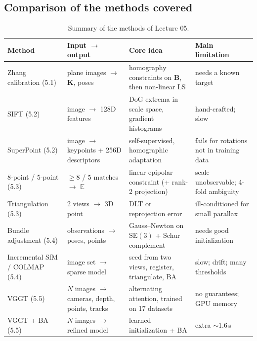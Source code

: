 \documentclass[11pt,a4paper]{article}
\newcommand{\E}{\mathbb{E}}
\newcommand{\SE}{\mathrm{SE}(3)}
\theoremstyle{definition}
\theoremstyle{plain}
\theoremstyle{remark}
\begin{document}
\subsection*{Comparison of the methods covered}
\begin{table}[H]
\centering
\small
\begin{tabular}{@{}p{2.9cm}p{3.5cm}p{4.0cm}p{3.1cm}@{}}
\toprule
Method & Input $\to$ output & Core idea & Main limitation\\
\midrule
Zhang calibration (5.1) & plane images $\to$ $\bm K$, poses & homography constraints on $\bm B$, then non-linear LS & needs a known target\\
SIFT (5.2) & image $\to$ 128D features & DoG extrema in scale space, gradient histograms & hand-crafted; slow\\
SuperPoint (5.2) & image $\to$ keypoints + 256D descriptors & self-supervised, homographic adaptation & fails for rotations not in training data\\
8-point / 5-point (5.3) & $\ge8$ / $5$ matches $\to$ $\E$ & linear epipolar constraint (+ rank-2 projection) & scale unobservable; 4-fold ambiguity\\
Triangulation (5.3) & 2 views $\to$ 3D point & DLT or reprojection error & ill-conditioned for small parallax\\
Bundle adjustment (5.4) & observations $\to$ poses, points & Gauss--Newton on $\SE$ + Schur complement & needs good initialization\\
Incremental SfM / COLMAP (5.4) & image set $\to$ sparse model & seed from two views, register, triangulate, BA & slow; drift; many thresholds\\
VGGT (5.5) & $N$ images $\to$ cameras, depth, points, tracks & alternating attention, trained on 17 datasets & no guarantees; GPU memory\\
VGGT + BA (5.5) & $N$ images $\to$ refined model & learned initialization + BA & extra $\sim1.6$\,s\\
\bottomrule
\end{tabular}
\caption{Summary of the methods of Lecture 05.}
\end{table}
\end{document}
